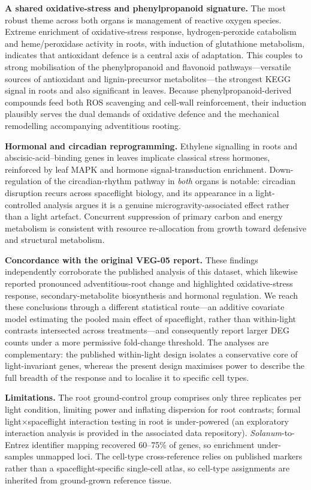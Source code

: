\documentclass[10pt,twocolumn]{article}
\begin{document}
\textbf{A shared oxidative-stress and phenylpropanoid signature.} The most robust
theme across both organs is management of reactive oxygen species. Extreme enrichment
of oxidative-stress response, hydrogen-peroxide catabolism and heme/peroxidase activity
in roots, with induction of glutathione metabolism, indicates that antioxidant defence
is a central axis of adaptation. This couples to strong mobilisation of the
phenylpropanoid and flavonoid pathways---versatile sources of antioxidant and
lignin-precursor metabolites---the strongest KEGG signal in roots and also significant
in leaves. Because phenylpropanoid-derived compounds feed both ROS scavenging and
cell-wall reinforcement, their induction plausibly serves the dual demands of
oxidative defence and the mechanical remodelling accompanying adventitious rooting.

\textbf{Hormonal and circadian reprogramming.} Ethylene signalling in roots and
abscisic-acid--binding genes in leaves implicate classical stress hormones, reinforced
by leaf MAPK and hormone signal-transduction enrichment. Down-regulation of the
circadian-rhythm pathway in \emph{both} organs is notable: circadian disruption
recurs across spaceflight biology, and its appearance in a light-controlled analysis
argues it is a genuine microgravity-associated effect rather than a light artefact.
Concurrent suppression of primary carbon and energy metabolism is consistent with
resource re-allocation from growth toward defensive and structural metabolism.

\textbf{Concordance with the original VEG-05 report.} These findings independently
corroborate the published analysis of this dataset\cite{dixit2026}, which likewise
reported pronounced adventitious-root change and highlighted oxidative-stress
response, secondary-metabolite biosynthesis and hormonal regulation. We reach these
conclusions through a different statistical route---an additive covariate model
estimating the pooled main effect of spaceflight, rather than within-light contrasts
intersected across treatments---and consequently report larger DEG counts under a more
permissive fold-change threshold. The analyses are complementary: the published
within-light design isolates a conservative core of light-invariant genes, whereas the
present design maximises power to describe the full breadth of the response and to
localise it to specific cell types.

\textbf{Limitations.} The root ground-control group comprises only three replicates
per light condition, limiting power and inflating dispersion for root contrasts;
formal light$\times$spaceflight interaction testing in root is under-powered (an
exploratory interaction analysis is provided in the associated data repository).
\textit{Solanum}-to-Entrez identifier mapping recovered 60--75\% of genes, so
enrichment under-samples unmapped loci. The cell-type cross-reference relies on
published markers rather than a spaceflight-specific single-cell atlas, so cell-type
assignments are inherited from ground-grown reference tissue.
\end{document}
